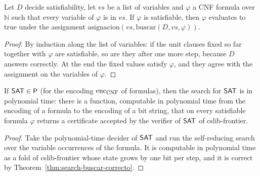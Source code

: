 \begin{theorem}
  \label{thm:search-buscar-correcto}
  \leanok
  Let $D$ decide satisfiability, let $vs$ be a list of variables and $\varphi$ a CNF formula over
  $\mathbb{N}$ such that every variable of $\varphi$ is in $vs$. If $\varphi$ is satisfiable, then
  $\varphi$ evaluates to true under the assignment
  $\mathrm{asignacion}(vs, \mathrm{buscar}(D, vs, \varphi))$.
\end{theorem}

\begin{proof}
  \leanok
  By induction along the list of variables: if the unit clauses fixed so far together with
  $\varphi$ are satisfiable, so are they after one more step, because $D$ answers correctly. At the
  end the fixed values satisfy $\varphi$, and they agree with the assignment on the variables of
  $\varphi$.
\end{proof}

\begin{theorem}
  \label{thm:search-busqueda-de-decision}
  \leanok
  If $\mathsf{SAT} \in \mathsf{P}$ (for the encoding $\mathrm{enc}_{\mathrm{CNF}}$ of formulas), then the search for
  $\mathsf{SAT}$ is in polynomial time: there is a function, computable in polynomial time from the
  encoding of a formula to the encoding of a bit string, that on every satisfiable formula
  $\varphi$ returns a certificate accepted by the verifier of $\mathsf{SAT}$ of cslib-frontier.
\end{theorem}

\begin{proof}
  \leanok
  Take the polynomial-time decider of $\mathsf{SAT}$ and run the self-reducing search over the variable
  occurrences of the formula. It is computable in polynomial time as a fold of cslib-frontier
  whose state grows by one bit per step, and it is correct by
  Theorem~\ref{thm:search-buscar-correcto}.
\end{proof}

